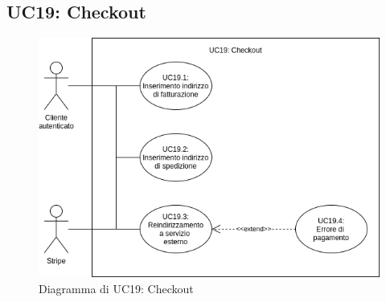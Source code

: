\newpage
\subsection{UC19: Checkout}
\label{sec:UC19}
\begin{figure}[!ht]
    \caption{Diagramma di UC19: Checkout}
    \vspace{10px}
    \includegraphics[scale=0.5]{../../../Images/AnalisiRequisiti/UC19}
    \centering
\end{figure}
